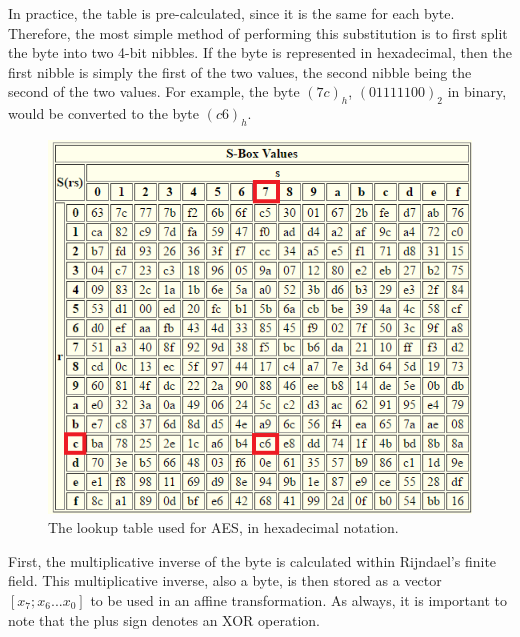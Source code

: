\documentclass[12pt]{report}
\begin{document}
In practice, the table is pre-calculated, since it is the same for each byte. Therefore, the most simple method of performing this substitution is to first split the byte into two 4-bit nibbles. If the byte is represented in hexadecimal, then the first nibble is simply the first of the two values, the second nibble being the second of the two values. For example, the byte $(7c)_h$, $(01111100)_2$ in binary, would be converted to the byte $(c6)_h$.

\begin{figure}[H]
\centering
\includegraphics[scale=1]{SBox.PNG}
\caption{The lookup table used for AES, in hexadecimal notation\cite{SBox}.}
\end{figure}

First, the multiplicative inverse of the byte is calculated within Rijndael's finite field. This multiplicative inverse, also a byte, is then stored as a vector $[x_7; x_6 ... x_0]$ to be used in an affine transformation. As always, it is important to note that the plus sign denotes an XOR operation.
\end{document}
